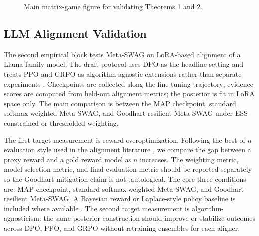 \documentclass[10pt]{article}
\theoremstyle{plain}
\theoremstyle{definition}
\theoremstyle{remark}
\begin{document}
\begin{figure}[H]
\centering
{}
\caption{Main matrix-game figure for validating Theorems 1 and 2.}
\end{figure}

\subsection{LLM Alignment Validation}

The second empirical block tests Meta-SWAG on LoRA-based alignment of a Llama-family model. The draft protocol uses DPO as the headline setting and treats PPO and GRPO as algorithm-agnostic extensions rather than separate experiments \citep{rafailov2023dpo,schulman2017ppo,shao2024deepseekmath}. Checkpoints are collected along the fine-tuning trajectory; evidence scores are computed from held-out alignment metrics; the posterior is fit in LoRA space only. The main comparison is between the MAP checkpoint, standard softmax-weighted Meta-SWAG, and Goodhart-resilient Meta-SWAG under ESS-constrained or thresholded weighting.

The first target measurement is reward overoptimization. Following the best-of-$n$ evaluation style used in the alignment literature \citep{gao2023overoptimization,rafailov2024daa}, we compare the gap between a proxy reward and a gold reward model as $n$ increases. The weighting metric, model-selection metric, and final evaluation metric should be reported separately so the Goodhart-mitigation claim is not tautological. The core three conditions are: MAP checkpoint, standard softmax-weighted Meta-SWAG, and Goodhart-resilient Meta-SWAG. A Bayesian reward or Laplace-style policy baseline is included where available \citep{yang2024laplacelora,yang2024brm}. The second target measurement is algorithm-agnosticism: the same posterior construction should improve or stabilize outcomes across DPO, PPO, and GRPO without retraining ensembles for each aligner.
\end{document}

